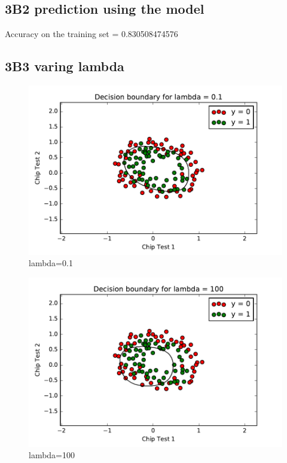 \documentclass[pdftex,11pt]{article}
\begin{document}
\subsection{3B2 prediction using the model}

Accuracy on the training set =  0.830508474576





\subsection{3B3 varing lambda}
\begin{figure}[H]
  \caption{lambda=0.1}
  \centering
    \includegraphics[scale=0.5]{fig401.pdf}
\end{figure}
\begin{figure}[H]
  \caption{lambda=100}
  \centering
    \includegraphics[scale=0.5]{fig4100.pdf}
\end{figure}
\end{document}
